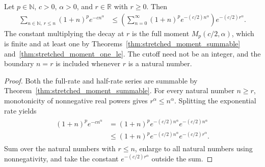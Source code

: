 \begin{theorem}
    \label{thm:stretched_moment_tail}
    \leanok
    Let $p\in\mathbb N$, $c>0$, $\alpha>0$, and $r\in\mathbb R$
    with $r\geq0$.  Then
    \begin{align}
        \label{eq:stretched_moment_tail}
        \sum_{n\in\mathbb N,\ r\leq n}(1+n)^p e^{-cn^\alpha}
         & \leq
        \left(\sum_{n=0}^{\infty}(1+n)^p e^{-(c/2)n^\alpha}\right)
        e^{-(c/2)r^\alpha}.
    \end{align}
    The constant multiplying the decay at $r$ is the full moment
    $M_p(c/2,\alpha)$, which is finite and at least one by
    Theorems~\ref{thm:stretched_moment_summable}
    and~\ref{thm:stretched_moment_one_le}.
    The cutoff need not be an integer, and the boundary $n=r$ is included
    whenever $r$ is a natural number.
\end{theorem}
\begin{proof}
    \leanok
    Both the full-rate and half-rate series are summable by
    Theorem~\ref{thm:stretched_moment_summable}.  For every natural
    number $n\geq r$, monotonicity of nonnegative real powers gives
    $r^\alpha\leq n^\alpha$.  Splitting the exponential rate yields
    \begin{align}
        \begin{aligned}
            (1+n)^p e^{-cn^\alpha}
             & =(1+n)^p e^{-(c/2)n^\alpha}e^{-(c/2)n^\alpha}      \\
             & \leq (1+n)^p e^{-(c/2)n^\alpha}e^{-(c/2)r^\alpha}.
        \end{aligned}
        \label{eq:stretched_tail_comparison}
    \end{align}
    Sum over the natural numbers with $r\leq n$, enlarge to all natural
    numbers using nonnegativity, and take the constant
    $e^{-(c/2)r^\alpha}$ outside the sum.
\end{proof}
